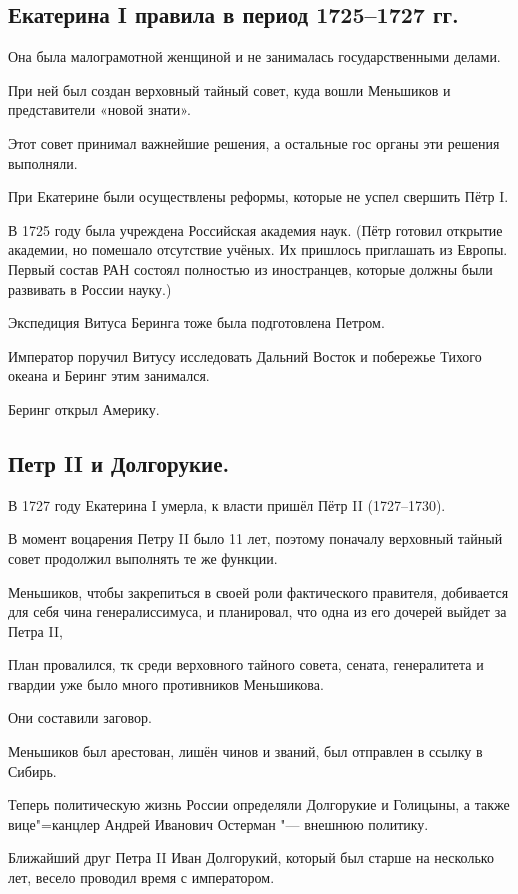 \subsection{Екатерина I правила в период 1725--1727 гг.}

Она была малограмотной женщиной и не занималась государственными делами.  

При ней был создан верховный тайный совет, куда вошли Меньшиков и представители «новой знати». 

Этот совет принимал важнейшие решения, а остальные гос органы  эти решения выполняли.

При Екатерине были осуществлены реформы, которые не успел свершить Пётр I. 

В 1725 году была учреждена Российская академия наук. (Пётр готовил открытие академии, но помешало отсутствие учёных. Их пришлось приглашать из Европы. Первый состав РАН состоял полностью из иностранцев, которые должны были развивать в России науку.)

Экспедиция Витуса Беринга тоже была подготовлена Петром. 

Император поручил Витусу исследовать Дальний Восток и побережье Тихого океана и Беринг этим занимался. 

Беринг открыл Америку.

\subsection{Петр II и Долгорукие.}
В 1727 году Екатерина I умерла, к власти пришёл Пётр II (1727--1730). 

В момент воцарения Петру II было 11 лет, поэтому поначалу верховный тайный совет продолжил выполнять те же функции.

Меньшиков, чтобы закрепиться в своей роли фактического правителя, добивается для себя чина генералиссимуса, и планировал, что одна из его дочерей выйдет за Петра II, 

План провалился, тк среди верховного тайного совета, сената, генералитета и гвардии уже было много противников Меньшикова. 

Они составили заговор. 

Меньшиков был арестован, лишён чинов и званий, был отправлен в ссылку в Сибирь.

Теперь политическую жизнь России определяли Долгорукие и Голицыны, а также вице"=канцлер Андрей Иванович Остерман "--- внешнюю политику. 

Ближайший друг Петра II Иван Долгорукий, который был старше на несколько лет, весело проводил время с императором.

